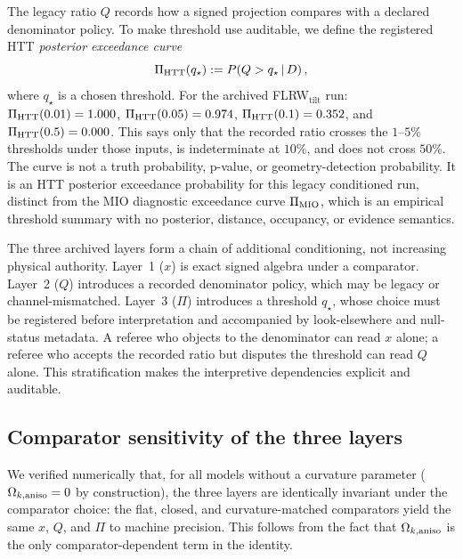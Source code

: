 The legacy ratio $Q$ records how a signed projection compares
with a declared denominator policy.  To make threshold use
auditable, we define the registered HTT \emph{posterior
exceedance curve}
\begin{equation}\label{eq:Pi-def}
\Pi_{\rm HTT}(q_\star) := P(Q > q_\star \,|\, D)\,,
\end{equation}
where $q_\star$ is a chosen threshold.  For the archived
FLRW$_{\mathrm{tilt}}$ run: $\Pi_{\rm HTT}(0.01) = 1.000$,
$\Pi_{\rm HTT}(0.05) = 0.974$,
$\Pi_{\rm HTT}(0.1) = 0.352$, and
$\Pi_{\rm HTT}(0.5) = 0.000$.  This says only that the recorded
ratio crosses the $1$--$5\%$ thresholds under those inputs, is
indeterminate at $10\%$, and does not cross $50\%$.  The curve is
not a truth probability, p-value, or geometry-detection probability.
It is an HTT posterior exceedance probability for this legacy
conditioned run, distinct from the MIO diagnostic exceedance curve
$\Pi_{\rm MIO}$, which is an empirical threshold summary with no
posterior, distance, occupancy, or evidence semantics.

\begin{remark}\label{rem:Pi-interpretation}
The three archived layers form a chain of additional conditioning,
not increasing physical authority.  Layer~1 ($x$) is exact signed
algebra under a comparator.  Layer~2 ($Q$) introduces a recorded
denominator policy, which may be legacy or channel-mismatched.
Layer~3 ($\Pi$) introduces a threshold $q_\star$, whose choice
must be registered before interpretation and accompanied by
look-elsewhere and null-status metadata.
A referee who objects to the denominator can read $x$ alone;
a referee who accepts the recorded ratio but disputes the threshold
can read $Q$ alone.  This stratification makes the
interpretive dependencies explicit and auditable.
\end{remark}


\subsection{Comparator sensitivity of the three layers}
\label{sec:comp-sensitivity}

We verified numerically that, for all models without a curvature
parameter ($\Omega_{k,\mathrm{aniso}} = 0$ by construction), the three layers are
identically invariant under the comparator choice: the flat,
closed, and curvature-matched comparators yield the same
$x$, $Q$, and $\Pi$ to machine precision.  This follows from
the fact that $\Omega_{k,\mathrm{aniso}}$ is the only comparator-dependent term
in the identity.

